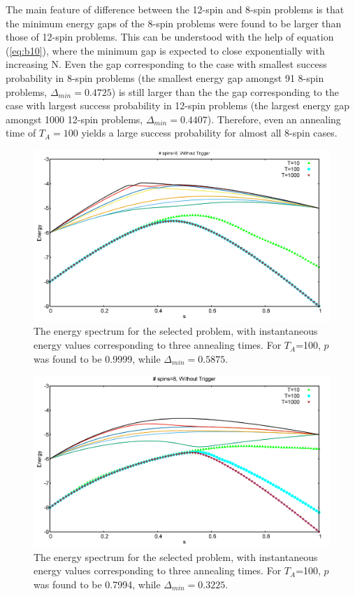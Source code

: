 \documentclass[../main.tex]{subfiles}
\begin{document}
The main feature of difference between the 12-spin and 8-spin problems is that the minimum energy gaps of the 8-spin problems were found to be larger than those of 12-spin problems. This can be understood with the help of equation (\ref{eq:b10}), where the minimum gap is expected to close exponentially with increasing N. Even the gap corresponding to the case with smallest success probability in 8-spin problems (the smallest energy gap amongst 91 8-spin problems, $\Delta_{min}=0.4725$) is still larger than the the gap corresponding to the case with largest success probability in 12-spin problems (the largest energy gap amongst 1000 12-spin problems, $\Delta_{min}=0.4407$). Therefore, even an annealing time of $T_A=100$ yields a large success probability for almost all 8-spin cases. 
\begin{figure}[H]
\centering 
\includegraphics[scale=0.24]{98_s8_O.png}
\caption{The energy spectrum for the selected problem, with instantaneous energy values corresponding to three annealing times. For $T_A$=100, $p$ was found to be 0.9999, while $\Delta_{min}=0.5875$.}
\label{fig:o5}
\end{figure}
\begin{figure}[H]
\centering 
\includegraphics[scale=0.3]{79_s8_O.png}
\caption{The energy spectrum for the selected problem, with instantaneous energy values corresponding to three annealing times. For $T_A$=100, $p$ was found to be 0.7994, while $\Delta_{min}=0.3225.$}
\label{fig:o6}
\end{figure}
\end{document}
